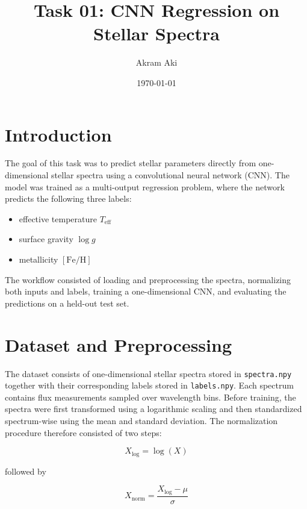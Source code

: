 

\title{Task 01: CNN Regression on Stellar Spectra}
\author{Akram Aki}
\date{\today}



\maketitle

\section{Introduction}
The goal of this task was to predict stellar parameters directly from one-dimensional stellar spectra using a convolutional neural network (CNN). 
The model was trained as a multi-output regression problem, where the network predicts the following three labels:

\begin{itemize}
    \item effective temperature $T_{\mathrm{eff}}$
    \item surface gravity $\log g$
    \item metallicity $[\mathrm{Fe}/\mathrm{H}]$
\end{itemize}

The workflow consisted of loading and preprocessing the spectra, normalizing both inputs and labels, training a one-dimensional CNN, and evaluating the predictions on a held-out test set.

\section{Dataset and Preprocessing}
The dataset consists of one-dimensional stellar spectra stored in \texttt{spectra.npy} together with their corresponding labels stored in \texttt{labels.npy}. Each spectrum contains 
flux measurements sampled over wavelength bins.
Before training, the spectra were first transformed using a logarithmic scaling and then standardized spectrum-wise using the mean and standard deviation. The normalization procedure 
therefore consisted of two steps:

\begin{equation*}
X_{\log} = \log(X)
\end{equation*}

followed by

\begin{equation*}
X_{\mathrm{norm}} = \frac{X_{\log} - \mu}{\sigma}
\end{equation*}

